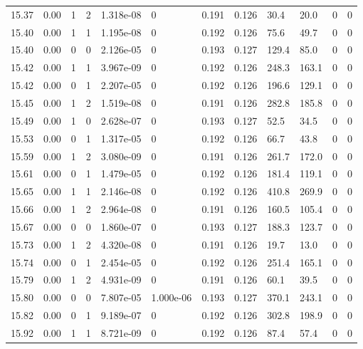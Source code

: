 \documentclass[preview]{standalone}
\begin{document}
{{{{{{{{{{{{\begin{tabular}{L{1.2cm}C{1.2cm} C{0.3cm}C{0.5cm} C{1.4cm}C{1.4cm} C{1.4cm}C{1.4cm} C{1.6cm}C{1.6cm} C{1.6cm}C{1.6cm}}
  15.37  &  0.00  & 1     &  2 &  1.318e-08  & 0  &  0.191&   0.126& 30.4 & 20.0   &  0 & 0  \\ 
  15.40  &  0.00  & 1     &  1 &  1.195e-08  & 0  &  0.192&   0.126& 75.6 & 49.7   &  0 & 0  \\ 
  15.40  &  0.00  & 0     &  0 &  2.126e-05  & 0  &  0.193&   0.127& 129.4 & 85.0   &  0 & 0  \\ 
  15.42  &  0.00  & 1     &  1 &  3.967e-09  & 0  &  0.192&   0.126& 248.3 & 163.1   &  0 & 0  \\ 
  15.42  &  0.00  & 0     &  1 &  2.207e-05  & 0  &  0.192&   0.126& 196.6 & 129.1   &  0 & 0  \\ 
  15.45  &  0.00  & 1     &  2 &  1.519e-08  & 0  &  0.191&   0.126& 282.8 & 185.8   &  0 & 0  \\ 
  15.49  &  0.00  & 1     &  0 &  2.628e-07  & 0  &  0.193&   0.127& 52.5 & 34.5   &  0 & 0  \\ 
  15.53  &  0.00  & 0     &  1 &  1.317e-05  & 0  &  0.192&   0.126& 66.7 & 43.8   &  0 & 0  \\ 
  15.59  &  0.00  & 1     &  2 &  3.080e-09  & 0  &  0.191&   0.126& 261.7 & 172.0   &  0 & 0  \\ 
  15.61  &  0.00  & 0     &  1 &  1.479e-05  & 0  &  0.192&   0.126& 181.4 & 119.1   &  0 & 0  \\ 
  15.65  &  0.00  & 1     &  1 &  2.146e-08  & 0  &  0.192&   0.126& 410.8 & 269.9   &  0 & 0  \\ 
  15.66  &  0.00  & 1     &  2 &  2.964e-08  & 0  &  0.191&   0.126& 160.5 & 105.4   &  0 & 0  \\ 
  15.67  &  0.00  & 0     &  0 &  1.860e-07  & 0  &  0.193&   0.127& 188.3 & 123.7   &  0 & 0  \\ 
  15.73  &  0.00  & 1     &  2 &  4.320e-08  & 0  &  0.191&   0.126& 19.7 & 13.0   &  0 & 0  \\ 
  15.74  &  0.00  & 0     &  1 &  2.454e-05  & 0  &  0.192&   0.126& 251.4 & 165.1   &  0 & 0  \\ 
  15.79  &  0.00  & 1     &  2 &  4.931e-09  & 0  &  0.191&   0.126& 60.1 & 39.5   &  0 & 0  \\ 
  15.80  &  0.00  & 0     &  0 &  7.807e-05  & 1.000e-06  &  0.193&   0.127& 370.1 & 243.1   &  0 & 0  \\ 
  15.82  &  0.00  & 0     &  1 &  9.189e-07  & 0  &  0.192&   0.126& 302.8 & 198.9   &  0 & 0  \\ 
  15.92  &  0.00  & 1     &  1 &  8.721e-09  & 0  &  0.192&   0.126& 87.4 & 57.4   &  0 & 0  \\ 

\end{tabular}}}}}}}}}}}}}
\end{document}
